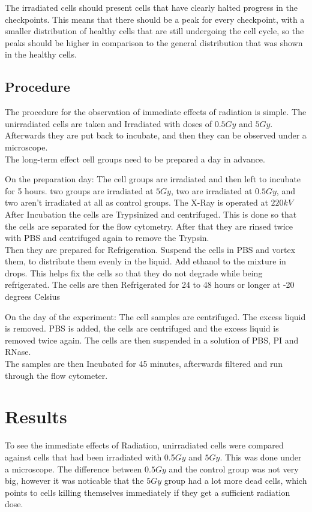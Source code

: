 \documentclass[]{scrartcl}
\begin{document}
The irradiated cells should present cells that have clearly halted progress in the checkpoints. This means that there should be a peak for every checkpoint, with a smaller distribution of healthy cells that are still undergoing the cell cycle, so the peaks should be higher in comparison to the general distribution that was shown in the healthy cells.

\subsection{Procedure}

The procedure for the observation of immediate effects of radiation is simple. The unirradiated cells are taken and Irradiated with doses of $0.5Gy$ and $5Gy$. Afterwards they are put back to incubate, and then they can be observed under a microscope.\\
The long-term effect cell groups need to be prepared a day in advance.

On the preparation day: The cell groups are irradiated and then left to incubate for 5 hours. two groups are irradiated at $5Gy$, two are irradiated at $0.5Gy$, and two aren't irradiated at all as control groups. The X-Ray is operated at $220kV$\\
After Incubation the cells are Trypsinized and centrifuged. This is done so that the cells are separated for the flow cytometry. After that they are rinsed twice with PBS and centrifuged again to remove the Trypsin.\\
Then they are prepared for Refrigeration. Suspend the cells in PBS and vortex them, to distribute them evenly in the liquid. Add ethanol to the mixture in drops. This helps fix the cells so that they do not degrade while being refrigerated. The cells are then Refrigerated for 24 to 48 hours or longer at -20 degrees Celsius

On the day of the experiment: The cell samples are centrifuged. The excess liquid is removed. PBS is added, the cells are centrifuged and the excess liquid is removed twice again. The cells are then suspended in a solution of PBS, PI and RNase.\\
The samples are then Incubated for 45 minutes, afterwards filtered and run through the flow cytometer.


\newpage
\section{Results}

To see the immediate effects of Radiation, unirradiated cells were compared against cells that had been irradiated with 0.5$Gy$ and $5Gy$. This was done under a microscope. The difference between $0.5 Gy$ and the control group was not very big, however it was noticable that the $5Gy$ group had a lot more dead cells, which points to cells killing themselves immediately if they get a sufficient radiation dose.
\end{document}
